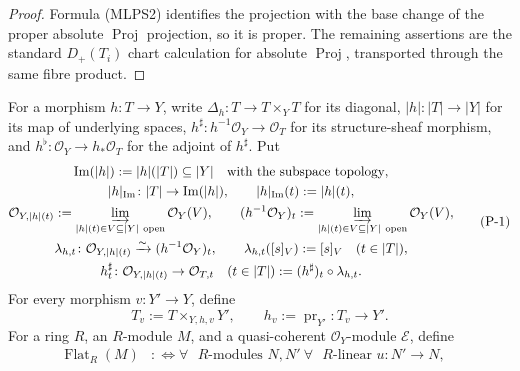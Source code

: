 \begin{proof}
  Formula (MLPS2) identifies the projection with the base change of the
  proper absolute $\operatorname{Proj}$ projection, so it is proper.
  The remaining assertions are the standard $D_+(T_i)$ chart calculation
  for absolute $\operatorname{Proj}$, transported through the same fibre
  product.
\end{proof}

\begin{definition}
  \label{def:nagata-morphism-predicate-notation}

  For a morphism \(h\colon T\to Y\), write
  \(\Delta_h\colon T\to T\times_YT\) for its diagonal,
  \(|h|\colon|T|\to|Y|\) for its map of underlying spaces,
  \(h^\sharp\colon h^{-1}\mathcal O_Y\to\mathcal O_T\) for its
  structure-sheaf morphism, and
  \(h^\flat\colon\mathcal O_Y\to h_*\mathcal O_T\) for the adjoint of
  \(h^\sharp\).  Put
  \[
  \begin{gathered}
    \operatorname{Im}(|h|):=|h|(|T|)\subseteq|Y|
      \quad\text{with the subspace topology},\\
    |h|_{\operatorname{Im}}\colon|T|\to\operatorname{Im}(|h|),
      \qquad |h|_{\operatorname{Im}}(t):=|h|(t),\\
    \mathcal O_{Y,|h|(t)}
      :=\varinjlim_{|h|(t)\in V\subseteq|Y|\ {\rm open}}\mathcal O_Y(V),
      \qquad
    (h^{-1}\mathcal O_Y)_t
      :=\varinjlim_{|h|(t)\in V\subseteq|Y|\ {\rm open}}\mathcal O_Y(V),\\
    \lambda_{h,t}\colon
      \mathcal O_{Y,|h|(t)}
        \xrightarrow{\sim}(h^{-1}\mathcal O_Y)_t,\qquad
    \lambda_{h,t}([s]_V):=[s]_V
      \quad(t\in|T|),\\
    h_t^\sharp\colon\mathcal O_{Y,|h|(t)}\to\mathcal O_{T,t}
      \quad(t\in|T|)
      :=(h^\sharp)_t\circ\lambda_{h,t}.
  \end{gathered}                                                    \tag{P-1}
  \]
  For every morphism \(v\colon Y'\to Y\), define
  \[
    T_v:=T\times_{Y,h,v}Y',\qquad
    h_v:=\operatorname{pr}_{Y'}\colon T_v\to Y'.                 \tag{P-2}
  \]
  For a ring \(R\), an \(R\)-module \(M\), and a quasi-coherent
  \(\mathcal O_Y\)-module \(\mathcal E\), define
  \[
  \begin{aligned}
    \operatorname{Flat}_R(M)
      &:\Longleftrightarrow
        \forall\text{ \(R\)-modules }N,N'\
        \forall\text{ \(R\)-linear }u\colon N'\to N,\quad

\end{aligned}\]
\end{definition}
